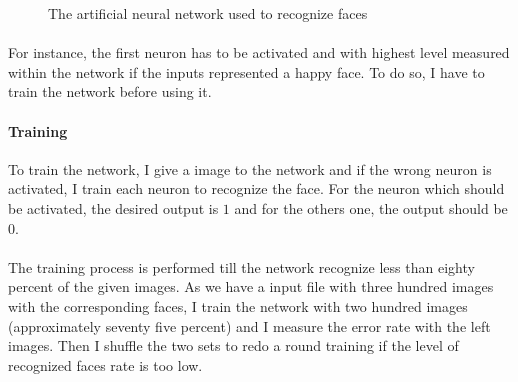 \begin{figure}[!h]
    \begin{center}
        
    \end{center}
    \caption{\label{fig:ann} The artificial neural network used to recognize faces}
\end{figure}

\paragraph{}{
    For instance, the first neuron has to be activated and with highest level 
 measured within the network if the inputs represented a happy face. To do so,
 I have to train the network before using it.
}

\paragraph{Training}{
    To train the network, I give a image to the network and if the wrong neuron
 is activated, I train each neuron to recognize the face. For the neuron which
 should be activated, the desired output is $1$ and for the others one, the 
 output should be $0$.
}

\paragraph{}{
    The training process is performed till the network recognize less than 
 eighty percent of the given images. As we have a input file with three hundred
 images with the corresponding faces, I train the network with two hundred images
 (approximately seventy five percent) and I measure the error rate with the 
 left images. Then I shuffle the two sets to redo a round training if the level 
 of recognized faces rate is too low.
}

